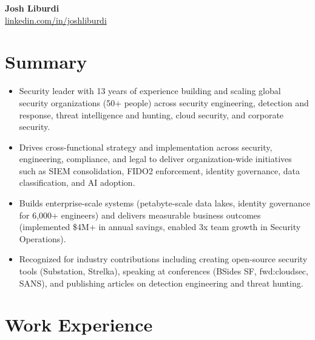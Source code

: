 \documentclass[10pt,letterpaper]{article}
\begin{document}
\begin{center}
  {\LARGE\bfseries Josh Liburdi}\\[3pt]
  \href{https://www.linkedin.com/in/joshliburdi/}{linkedin.com/in/joshliburdi}
\end{center}

\section{Summary}
\begin{itemize}
  \item Security leader with 13 years of experience building and scaling global security organizations (50+ people) across security engineering, detection and response, threat intelligence and hunting, cloud security, and corporate security.
  \item Drives cross-functional strategy and implementation across security, engineering, compliance, and legal to deliver organization-wide initiatives such as SIEM consolidation, FIDO2 enforcement, identity governance, data classification, and AI adoption.
  \item Builds enterprise-scale systems (petabyte-scale data lakes, identity governance for 6,000+ engineers) and delivers measurable business outcomes (implemented \$4M+ in annual savings, enabled 3x team growth in Security Operations).
  \item Recognized for industry contributions including creating open-source security tools (Substation, Strelka), speaking at conferences (BSides SF, fwd:cloudsec, SANS), and publishing articles on detection engineering and threat hunting.
\end{itemize}

\section{Work Experience}
\end{document}
